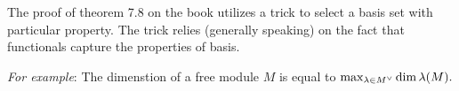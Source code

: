     \begin{remark}
        The proof of theorem 7.8 on the book utilizes a trick to select a basis set with particular property. The trick relies (generally speaking) on the fact that functionals capture the properties of basis.

        \noindent \textit{For example}: The dimenstion of a free module $M$ is equal to $\max_{\lambda \in M^{\vee}} \dim \lambda(M).$
    \end{remark}

 


    
    
